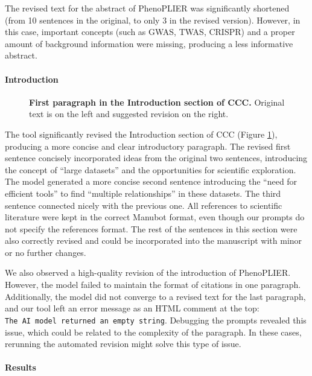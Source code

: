 \documentclass[
]{article}
\begin{document}
The revised text for the abstract of PhenoPLIER was significantly shortened (from 10 sentences in the original, to only 3 in the revised version).
However, in this case, important concepts (such as GWAS, TWAS, CRISPR) and a proper amount of background information were missing, producing a less informative abstract.

\paragraph{Introduction}

\begin{figure}
\hypertarget{fig:intro:ccc}{%
\centering

\caption{\textbf{First paragraph in the Introduction section of CCC.}
Original text is on the left and suggested revision on the right.}\label{fig:intro:ccc}
}
\end{figure}

The tool significantly revised the Introduction section of CCC (Figure \ref{fig:intro:ccc}), producing a more concise and clear introductory paragraph.
The revised first sentence concisely incorporated ideas from the original two sentences, introducing the concept of ``large datasets'' and the opportunities for scientific exploration.
The model generated a more concise second sentence introducing the ``need for efficient tools'' to find ``multiple relationships'' in these datasets.
The third sentence connected nicely with the previous one.
All references to scientific literature were kept in the correct Manubot format, even though our prompts do not specify the references format.
The rest of the sentences in this section were also correctly revised and could be incorporated into the manuscript with minor or no further changes.

We also observed a high-quality revision of the introduction of PhenoPLIER.
However, the model failed to maintain the format of citations in one paragraph.
Additionally, the model did not converge to a revised text for the last paragraph, and our tool left an error message as an HTML comment at the top: \texttt{The\ AI\ model\ returned\ an\ empty\ string}.
Debugging the prompts revealed this issue, which could be related to the complexity of the paragraph.
In these cases, rerunning the automated revision might solve this type of issue.

\paragraph{Results}
\end{document}
